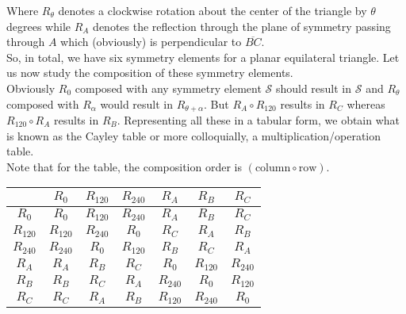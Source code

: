 Where $R_\theta$ denotes a clockwise rotation about the center of the triangle by $\theta$ degrees while $R_A$ denotes the reflection through the plane of symmetry passing through $A$ which (obviously) is perpendicular to $\overline{BC}$.\\
So, in total, we have six symmetry elements for a planar equilateral triangle. Let us now study the composition of these symmetry elements.\\
Obviously $R_0$ composed with any symmetry element $\mathcal{S}$ should result in $\mathcal{S}$ and $R_\theta$ composed with $R_\alpha$ would result in $R_{\theta+\alpha}$. But $R_A\circ R_{120}$ results in $R_C$ whereas $R_{120}\circ R_A$ results in $R_B$. Representing all these in a tabular form, we obtain what is known as the Cayley table or more colloquially, a multiplication/operation table.\\
Note that for the table, the composition order is $(\text{column}\circ\text{row})$.
\begin{center}
\begin{tabular}{c|c c c c c c}
	  & $R_{0}$ & $R_{120}$ & $R_{240}$ & $R_{A}$ & $R_{B}$ & $R_{C}$\\
	  \hline
	  $R_0$ & $R_{0}$ & $R_{120}$ & $R_{240}$ & $R_{A}$ & $R_{B}$ & $R_{C}$\\
	  $R_{120}$ & $R_{120}$ & $R_{240}$ & $R_{0}$ & $R_C$ & $R_A$ & $R_B$\\
	  $R_{240}$ & $R_{240}$ & $R_0$ & $R_{120}$ & $R_B$ & $R_C$ & $R_A$\\
	  $R_A$ & $R_A$ & $R_B$ & $R_C$ & $R_0$ & $R_{120}$ & $R_{240}$\\
	  $R_B$ & $R_B$ & $R_C$ & $R_A$ & $R_{240}$ & $R_0$ & $R_{120}$\\
	  $R_C$ & $R_C$ & $R_A$ & $R_B$ & $R_{120}$ & $R_{240}$ & $R_0$\\
\end{tabular}
\end{center}

